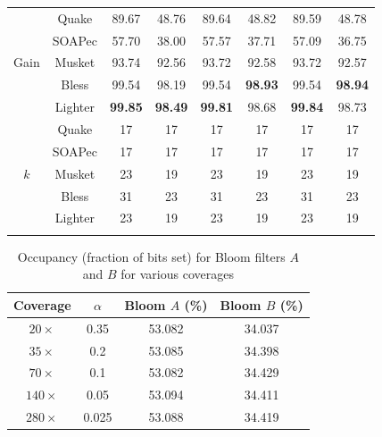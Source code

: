 \documentclass{bmcart}
\begin{document}
\begin{backmatter}
\begin{table}[h!]
\begin{tabular}{|c|c|c|c|c|c|c|c|}
		&	Quake&	89.67&	48.76&	89.64&	48.82&	89.59&	48.78	\\ \cline{2-8}
		& SOAPec&	57.70& 	38.00& 	57.57&	37.71&	57.09&	36.75 	\\ \cline{2-8}
Gain	&	Musket&	93.74&	92.56&	93.72&	92.58&	93.72&	92.57	\\ \cline{2-8}
		&	Bless&	99.54&	98.19&	99.54&	\textbf{98.93}&	99.54&	\textbf{98.94}	\\ \cline{2-8}
		&	Lighter&\textbf{99.85}&	\textbf{98.49}&	\textbf{99.81}&	98.68&	\textbf{99.84}&	98.73	\\ \hhline{|=|=|=|=|=|=|=|=|}
		
		&Quake	&17	&17	&17	&17	&17	&17 \\ \cline{2-8}
		&SOAPec	&17	&17	&17	&17	&17	&17 \\ \cline{2-8}
$k$		&Musket	&23	&19	&23	&19	&23	&19 \\ \cline{2-8}
		&Bless	&31	&23	&31	&23	&31	&23 \\ \cline{2-8}
		&Lighter	&23	&19	&23	&19	&23	&19 \\ \hhline{|=|=|=|=|=|=|=|=|}
\end{tabular}
\end{table}


\begin{table}[h!] %
\caption{Occupancy (fraction of bits set) for Bloom filters $A$ and $B$ for various coverages}
\begin{tabular}{|c|c|c|c|}\hline
Coverage & $\alpha$ & Bloom $A$ (\%) & Bloom $B$ (\%) \\ \hline
$20\times$	& 0.35 & 53.082 & 34.037 \\ \hline
$35\times$ & 0.2 & 53.085 &34.398\\ \hline
$70\times$ & 0.1 &53.082 & 34.429 \\ \hline
$140\times$ & 0.05 & 53.094 &34.411  \\ \hline
$280\times$ & 0.025 & 53.088 &34.419\\ \hline
\end{tabular}
\end{table}


\end{backmatter}
\end{document}
